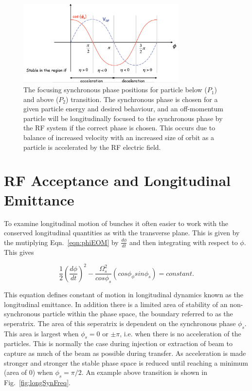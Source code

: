 \begin{figure}
\begin{center}
\includegraphics[width=0.75\textwidth]{appendices/figures/longStab.png}
\end{center}
\caption{The focusing synchronous phase positions for particle below ($P_{1}$) and above ($P_{2}$) transition. The synchronous phase is chosen for a given particle energy and desired behaviour, and an off-momentum particle will be longitudinally focused to the synchronous phase by the RF system if the correct phase is chosen. This occurs due to balance of increased velocity with an increased size of orbit as a particle is accelerated by the RF electric field.}
\label{fig:longPhase}
\end{figure}

\section{RF Acceptance and Longitudinal Emittance}

To examine longitudinal motion of bunches it often easier to work with the conserved longitudinal quantities as with the transverse plane. This is given by the mutiplying Eqn.~\ref{eqn:phiEOM} by $\frac{d\phi}{dt}$ and then integrating with respect to $\phi$. This gives

\begin{equation}
\frac{1}{2}\left( \frac{d\phi}{dt} \right)^{2} - \frac{\Omega_{s}^{2}}{cos\phi_{s}} \left( cos\phi _ \phi sin\phi_{s} \right) = constant.
\end{equation} 

This equation defines constant of motion in longitudinal dynamics known as the longitudinal emittance. In addition there is a limited area of stability of an non-synchronous particle within the phase space, the boundary referred to as the seperatrix. The area of this seperatrix is dependent on the synchronous phase $\phi_{s}$. This area is largest when $\phi_{s}=0$ or $\pm \pi$, i.e. when there is no acceleration of the particles. This is normally the case during injection or extraction of beam to capture as much of the beam as possible during transfer. As acceleration is made stronger and stronger the stable phase space is reduced until reaching a minimum (area of $0$) when $\phi_{s}=\pi /2$. An example above transition is shown in Fig.~\ref{fig:longSynFreq}.

